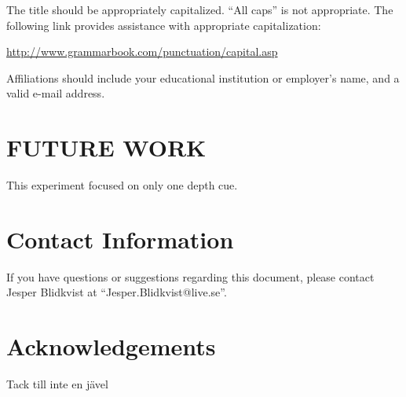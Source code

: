 \documentclass[tog]{acmsiggraph}
\begin{document}
The title should be appropriately capitalized. ``All caps'' is not
appropriate. The following link provides assistance with appropriate
capitalization:

{\small\url{http://www.grammarbook.com/punctuation/capital.asp}}

Affiliations should include your educational institution or employer's
name, and a valid e-mail address.

\section{FUTURE WORK}

This experiment focused on only one depth cue. 




\section{Contact Information}

If you have questions or suggestions regarding this document, please
contact Jesper Blidkvist at ``Jesper.Blidkvist@live.se''.

\section*{Acknowledgements}

Tack till inte en jävel


\nocite{*}

\end{document}
